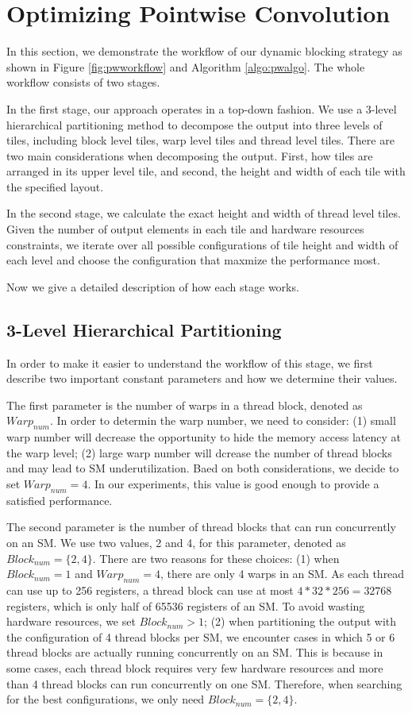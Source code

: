 \section{Optimizing Pointwise Convolution}
\label{sec:pwconv}
In this section, we demonstrate the workflow of our dynamic blocking strategy as shown in Figure \ref{fig:pwworkflow} and Algorithm \ref{algo:pwalgo}. 
The whole workflow consists of two stages. 

In the first stage, our approach operates in a top-down fashion. 
We use a 3-level hierarchical partitioning method to decompose the output into three levels of tiles, including block level tiles, warp level tiles and thread level tiles. 
There are two main considerations when decomposing the output. First, how tiles are arranged in its upper level tile, and second, the height and width of each tile with the specified layout.

In the second stage, we calculate the exact height and width of thread level tiles. 
Given the number of output elements in each tile and hardware resources constraints, we iterate over all possible configurations of tile height and width of each level and choose the configuration that maxmize the performance most.

Now we give a detailed description of how each stage works.
\subsection{3-Level Hierarchical Partitioning}
In order to make it easier to understand the workflow of this stage, we first describe two important constant parameters and how we determine their values.

The first parameter is the number of warps in a thread block, denoted as $Warp_{num}$.
In order to determin the warp number, we need to consider: (1) small warp number will decrease the opportunity to hide the memory access latency at the warp level;
(2) large warp number will dcrease the number of thread blocks and may lead to SM underutilization.
Baed on both considerations, we decide to set $Warp_{num}=4$.
In our experiments, this value is good enough to provide a satisfied performance.

The second parameter is the number of thread blocks that can run concurrently on an SM.
We use two values, 2 and 4, for this parameter, denoted as $Block_{num}=\{2, 4\}$. 
There are two reasons for these choices: 
(1) when $Block_{num}=1$ and $Warp_{num}=4$, there are only 4 warps in an SM. 
As each thread can use up to 256 registers, a thread block can use at most $4*32*256=32768$ registers, which is only half of 65536 registers of an SM.
To avoid wasting hardware resources, we set $Block_{num}>1$; 
(2) when partitioning the output with the configuration of 4 thread blocks per SM, we encounter cases in which 5 or 6 thread blocks are actually running concurrently on an SM. 
This is because in some cases, each thread block requires very few hardware resources and more than 4 thread blocks can run concurrently on one SM.
Therefore, when searching for the best configurations, we only need $Block_{num}=\{2,4\}$.

